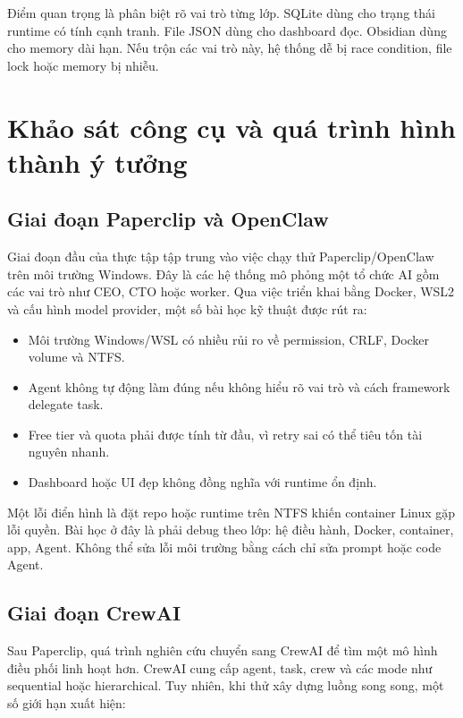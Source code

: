 \documentclass[12pt,a4paper]{article}
\begin{document}
Điểm quan trọng là phân biệt rõ vai trò từng lớp. SQLite dùng cho trạng thái runtime có tính cạnh tranh. File JSON dùng cho dashboard đọc. Obsidian dùng cho memory dài hạn. Nếu trộn các vai trò này, hệ thống dễ bị race condition, file lock hoặc memory bị nhiễu.

\section{Khảo sát công cụ và quá trình hình thành ý tưởng}

\subsection{Giai đoạn Paperclip và OpenClaw}

Giai đoạn đầu của thực tập tập trung vào việc chạy thử Paperclip/OpenClaw trên môi trường Windows. Đây là các hệ thống mô phỏng một tổ chức AI gồm các vai trò như CEO, CTO hoặc worker. Qua việc triển khai bằng Docker, WSL2 và cấu hình model provider, một số bài học kỹ thuật được rút ra:

\begin{itemize}
    \item Môi trường Windows/WSL có nhiều rủi ro về permission, CRLF, Docker volume và NTFS.
    \item Agent không tự động làm đúng nếu không hiểu rõ vai trò và cách framework delegate task.
    \item Free tier và quota phải được tính từ đầu, vì retry sai có thể tiêu tốn tài nguyên nhanh.
    \item Dashboard hoặc UI đẹp không đồng nghĩa với runtime ổn định.
\end{itemize}

Một lỗi điển hình là đặt repo hoặc runtime trên NTFS khiến container Linux gặp lỗi quyền. Bài học ở đây là phải debug theo lớp: hệ điều hành, Docker, container, app, Agent. Không thể sửa lỗi môi trường bằng cách chỉ sửa prompt hoặc code Agent.

\subsection{Giai đoạn CrewAI}

Sau Paperclip, quá trình nghiên cứu chuyển sang CrewAI để tìm một mô hình điều phối linh hoạt hơn. CrewAI cung cấp agent, task, crew và các mode như sequential hoặc hierarchical. Tuy nhiên, khi thử xây dựng luồng song song, một số giới hạn xuất hiện:
\end{document}
